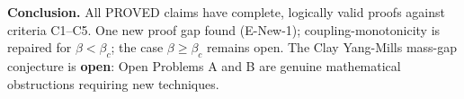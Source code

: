 \medskip
\noindent\textbf{Conclusion.}
All PROVED claims have complete, logically valid proofs against criteria C1--C5.
One new proof gap found (E-New-1); coupling-monotonicity is repaired for $\beta<\beta_c$;
the case $\beta\ge\beta_c$ remains open.
The Clay Yang-Mills mass-gap conjecture is \textbf{open}:
Open Problems A and B are genuine mathematical obstructions requiring new techniques.

\endinput
